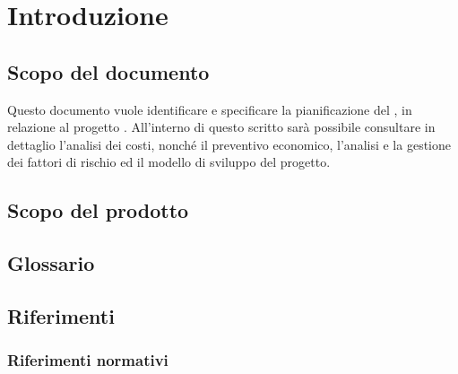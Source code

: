 \section{Introduzione} \label{introduzione}

    \subsection{Scopo del documento}

        Questo documento vuole identificare e specificare la pianificazione del  \GroupName,
        in relazione al progetto \ProjectName.
        All'interno di questo scritto sarà possibile consultare in dettaglio l'analisi dei costi, nonché il preventivo
        economico, l'analisi e la gestione dei fattori di rischio ed il modello di sviluppo del progetto.

    \subsection{Scopo del prodotto}

        \ScopoProdotto{}

    \subsection{Glossario}

        \DescrizioneGlossario{}

    \subsection{Riferimenti}

        \subsubsection{Riferimenti normativi}

